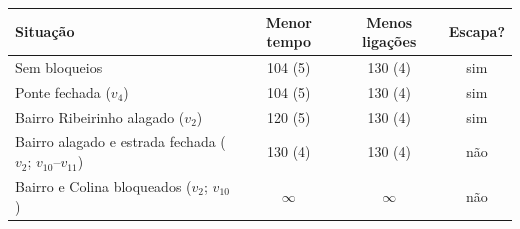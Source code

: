 \begin{tabular}{lccc}
\toprule
Situação & Menor tempo & Menos ligações & Escapa? \\
\midrule
Sem bloqueios & 104 (5) & 130 (4) & sim \\
Ponte fechada ($v_4$) & 104 (5) & 130 (4) & sim \\
Bairro Ribeirinho alagado ($v_2$) & 120 (5) & 130 (4) & sim \\
Bairro alagado e estrada fechada ($v_2$; $v_{10}$--$v_{11}$) & 130 (4) & 130 (4) & não \\
Bairro e Colina bloqueados ($v_2$; $v_{10}$) & $\infty$ & $\infty$ & não \\
\bottomrule
\end{tabular}
